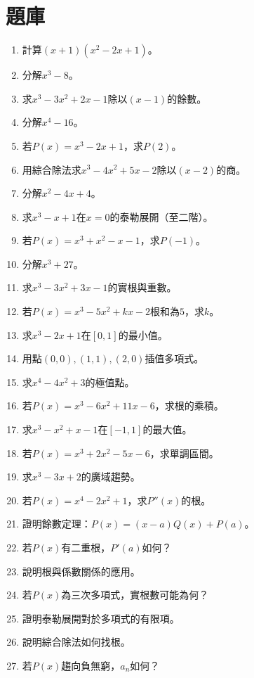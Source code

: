 \section{題庫}
\begin{enumerate}[label=\arabic*.]
    \item 計算$(x + 1)(x^2 - 2x + 1)$。
    \item 分解$x^3 - 8$。
    \item 求$x^3 - 3x^2 + 2x - 1$除以$(x - 1)$的餘數。
    \item 分解$x^4 - 16$。
    \item 若$P(x) = x^3 - 2x + 1$，求$P(2)$。
    \item 用綜合除法求$x^3 - 4x^2 + 5x - 2$除以$(x - 2)$的商。
    \item 分解$x^2 - 4x + 4$。
    \item 求$x^3 - x + 1$在$x = 0$的泰勒展開（至二階）。
    \item 若$P(x) = x^3 + x^2 - x - 1$，求$P(-1)$。
    \item 分解$x^3 + 27$。
    \item 求$x^3 - 3x^2 + 3x - 1$的實根與重數。
    \item 若$P(x) = x^3 - 5x^2 + kx - 2$根和為$5$，求$k$。
    \item 求$x^3 - 2x + 1$在$[0, 1]$的最小值。
    \item 用點$(0, 0), (1, 1), (2, 0)$插值多項式。
    \item 求$x^4 - 4x^2 + 3$的極值點。
    \item 若$P(x) = x^3 - 6x^2 + 11x - 6$，求根的乘積。
    \item 求$x^3 - x^2 + x - 1$在$[-1, 1]$的最大值。
    \item 若$P(x) = x^3 + 2x^2 - 5x - 6$，求單調區間。
    \item 求$x^3 - 3x + 2$的廣域趨勢。
    \item 若$P(x) = x^4 - 2x^2 + 1$，求$P''(x)$的根。
    \item 證明餘數定理：$P(x) = (x - a)Q(x) + P(a)$。
    \item 若$P(x)$有二重根，$P'(a)$如何？
    \item 說明根與係數關係的應用。
    \item 若$P(x)$為三次多項式，實根數可能為何？
    \item 證明泰勒展開對於多項式的有限項。
    \item 說明綜合除法如何找根。
    \item 若$P(x)$趨向負無窮，$a_n$如何？

\end{enumerate}

